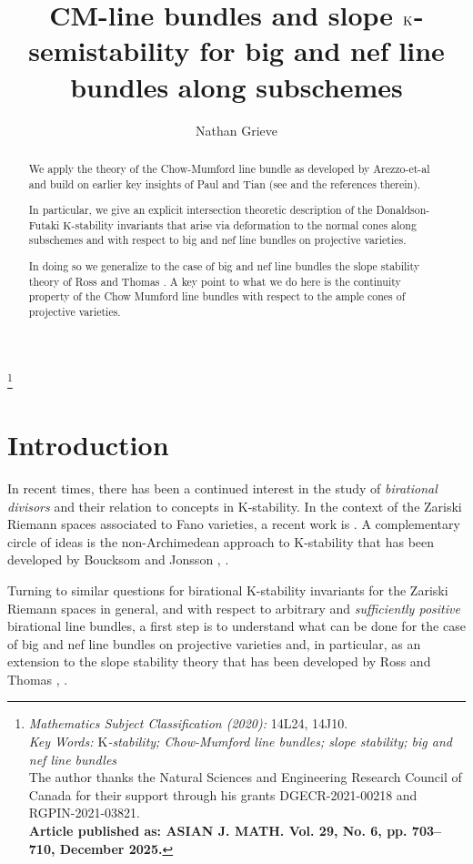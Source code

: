 \documentclass[12pt]{amsart}
\title[Slope $\K$-semistability for big and nef line bundles]{\uppercase{CM}-line bundles and slope $\K$-semistability for big and nef line bundles along subschemes}
\author{Nathan Grieve}
\newcommand{\K}{\mathrm{K}}
\theoremstyle{definition}
\numberwithin{equation}{section}
\begin{document}
\begin{abstract}
We apply the theory of the Chow-Mumford line bundle as developed by Arezzo-et-al and build on earlier key insights of Paul and Tian (see \cite{Arezzo:DellaVedova:LaNave} and the references therein).  

In particular, we give an explicit intersection theoretic description of the Donaldson-Futaki $\K$-stability invariants that arise via deformation to the normal cones along subschemes and with respect to big and nef line bundles on projective varieties.  

In doing so we generalize to the case of big and nef line bundles the slope stability theory of Ross and Thomas \cite[Section 4]{Ross:Thomas:2006}.  A key point to what we do here is the continuity property of the Chow Mumford line bundles with respect to the ample cones of projective varieties.
\end{abstract}


\thanks{
\emph{Mathematics Subject Classification (2020):}  14L24, 14J10. \\
\emph{Key Words: $\K$-stability; Chow-Mumford line bundles; slope stability; big and nef line bundles}  \\
The author thanks the Natural Sciences and Engineering Research Council of Canada for their support through his grants DGECR-2021-00218 and RGPIN-2021-03821. \\
\textbf{Article published as: ASIAN J. MATH. Vol. 29, No. 6, pp. 703–710, December 2025.}
}

\maketitle



\section{Introduction}\label{intro}

In recent times, there has been a continued interest in the study of \emph{birational divisors} and their relation to concepts in $\K$-stability.  In the context of the Zariski Riemann spaces associated to Fano varieties, a recent work is \cite{Trusiani:2024}.  A complementary circle of ideas is the non-{A}rchimedean approach to $\K$-stability that has been developed by Boucksom and Jonsson \cite{Boucksom:Jonsson:2023}, \cite{Boucksom:Jonsson:2023a}.

Turning to similar questions for birational $\K$-stability invariants for the Zariski Riemann spaces in general, and with respect to arbitrary and \emph{sufficiently positive} birational line bundles, a first step is to understand what can be done for the case of big and nef line bundles on projective varieties and, in particular, as an extension to the slope stability theory that has been developed by Ross and Thomas \cite{Ross:Thomas:2006}, \cite{Ross:Thomas:2007}.  
\end{document}
